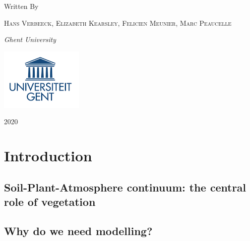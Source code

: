 \documentclass[oneside]{book}
\begin{document}
\begin{titlepage}
	Written By
	
	\vspace{0.5\baselineskip} %
	
	{\scshape Hans Verbeeck, Elizabeth Kearsley, Felicien Meunier, Marc Peaucelle \\} %
	
	\vspace{0.5\baselineskip} %
	
	\textit{Ghent University \\} %
	
	\vfill %
	
	
	
	\includegraphics[width=40mm]{figures/UGhent.png}
	
	\vspace{0.3\baselineskip} %
	
	2020 %
	

\end{titlepage}

{
\setcounter{tocdepth}{1}
\tableofcontents
}
\mainmatter

\chapter{Introduction}\label{intro}

\section{Soil-Plant-Atmosphere continuum: the central role of
vegetation}\label{soil-plant-atmosphere-continuum-the-central-role-of-vegetation}

\section{Why do we need modelling?}\label{why-do-we-need-modelling}
\end{document}

